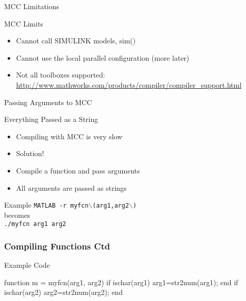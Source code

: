 \documentclass[handout]{beamer}
\begin{document}
   
   \begin{frame}{MCC Limitations}
    \begin{block}{MCC Limits}
     \begin{itemize}
     \item Cannot call SIMULINK models, sim()
     \item Cannot use the local parallel configuration (more later)
     \item Not all toolboxes supported: \\
      \url{http://www.mathworks.com/products/compiler/compiler\_support.html}
     \end{itemize}
    \end{block}
   \end{frame}

   \begin{frame}{Passing Arguments to MCC}
    \begin{block}{Everything Passed as a String}
     \begin{itemize}
      \item Compiling with MCC is very slow
      \item <2->Solution!
      \item <3->Compile a function and pass arguments
      \item <3->All arguments are passed as strings
     \end{itemize}
    \end{block}
    \begin{block}{Example}
     \texttt{MATLAB -r myfcn$\backslash$(arg1,arg2$\backslash$)}
     \\ becomes \\
     \texttt{./myfcn arg1 arg2}
    \end{block}
   \end{frame}

\begin{frame}[fragile]
    \frametitle{Compiling Functions Ctd}
    \begin{block}{Example Code}
    \begin{semiverbatim}
	function m = myfcn(arg1, arg2)
	if ischar(arg1)
	   arg1=str2num(arg1);
	end
	if ischar(arg2)
	   arg2=str2num(arg2);
	end
    \end{semiverbatim}
    \end{block}
\end{frame}
\end{document}
